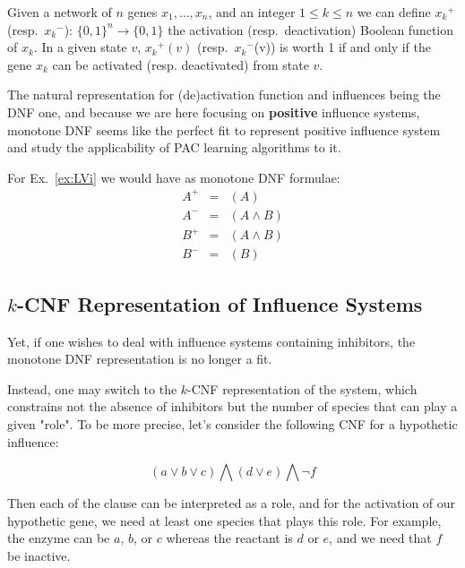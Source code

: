 \documentclass{llncs}
\begin{document}
\begin{definition}
	\label{def:activation}
	Given a network of $n$ genes $x_1,\ldots,x_n$, and
	an integer $1 \leq k \leq n$ we can define ${x_k}^+$ (resp.\ ${x_k}^-$):
	${\{0,1\}}^n \rightarrow\{0,1\}$ the activation (resp.\ deactivation)
	Boolean function of $x_k$. In a given state $v$, ${x_k}^+(v)$ (resp.\ ${x_k}^-$(v)) is worth 1 if and only if the gene $x_k$ can be activated (resp. deactivated) from state $v$.
\end{definition}

The natural representation for (de)activation function and influences being the DNF one, and because we are here focusing on \textbf{positive} influence systems, monotone DNF seems like the perfect fit to represent positive influence system and study the applicability of PAC learning algorithms to it.

\begin{example}

For Ex.~\ref{ex:LVi} we would have as monotone DNF formulae:
\begin{eqnarray*}
   A^+&=&(A)\\
   A^-&=&(A \wedge B)\\
   B^+&=&(A\wedge B)\\
   B^-&=&(B)
\end{eqnarray*}

\end{example}

\subsection{$k$-CNF Representation of Influence Systems}

Yet, if one wishes to deal with influence systems containing inhibitors, the monotone DNF representation is no longer a fit.

Instead, one may switch to the $k$-CNF representation of the system, which constrains not the absence of inhibitors but the number of species that can play a given "role". To be more precise, let's consider the following CNF for a hypothetic influence:

\[
\left(a \vee b \vee c\right) \bigwedge
\left(d \vee e\right) \bigwedge 
\neg f
\]

Then each of the clause can be interpreted as a role, and for the activation of our hypothetic gene, we need at least one species that plays this role. For example, the enzyme can be $a$, $b$, or $c$ whereas 
the reactant is $d$ or $e$, and we need that $f$ be inactive.
\end{document}
